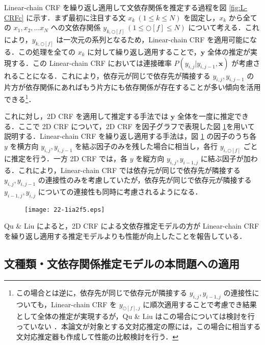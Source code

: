 \documentclass[japanese]{jnlp_1.4}
\begin{document}
Linear-chain CRF を繰り返し適用して文依存関係を推定する過程を図 \ref{fig:L-CRFc} に示す．まず最初に注目する文 $x_k ~ (1 \leq k \leq N)$ を固定し，$x_k$ から全ての $x_1, x_2, \dots x_N$ への文依存関係 $y_{k,\Circle[f]} ~ (1 \leq \Circle[f] \leq N)$ について考える．これにより，$y_{k,\Circle[f]}$ は一次元の系列となるため，Linear-chain CRF を適用可能になる．この処理を全ての $x_k$ に対して繰り返し適用することで，$\bm{y}$ 全体の推定が実現する．この Linear-chain CRF においては連接確率 $P(y_{i,j}|y_{i,j-1},\bm{x})$ が考慮されることになる．これにより，依存元が同じで依存先が隣接する $y_{i,j}, y_{i,j-1}$ の片方が依存関係にあればもう片方にも依存関係が存在することが多い傾向を活用できる\footnote{この場合とは逆に，依存先が同じで依存元が隣接する $y_{i,j}, y_{i-1,j}$ の連接性についても，Linear-chain CRF を $y_{\Circle[f],j}$ に順次適用することで考慮でき結果として全体の推定が実現するが，Qu \& Liu はこの場合については検討を行っていない \cite{Zhonghua2012}．本論文が対象とする文対応推定の際には，この場合に相当する文対応推定器も作成して性能の比較検討を行う．}．

これに対し，2D CRF を適用して推定する手法では $\bm{y}$ 全体を一度に推定できる．ここで 2D CRF について，2D CRF を因子グラフで表現した図 \ref{fig:2D-CRFc}を用いて説明する．Linear-chain CRF を繰り返し適用する手法は，図 \ref{fig:2D-CRFc} の因子のうち各 $y$ を横方向 $y_{i,j}, y_{i,j-1}$ を結ぶ因子のみを残した場合に相当し，各行 $y_{i,\Circle[f]}$ ごとに推定を行う．一方 2D CRF では，各 $y$ を縦方向 $y_{i,j}, y_{i-1,j}$ に結ぶ因子が加わる．これにより，Linear-chain CRF では依存元が同じで依存先が隣接する $y_{i,j}, y_{i,j-1}$ の連接性のみを考慮していたが，依存先が同じで依存元が隣接する $y_{i-1,j}, y_{i,j}$ についての連接性も同時に考慮されるようになる．

\begin{figure}[t]
\begin{center}
\texttt{[image: 22-1ia2f5.eps]}
\end{center}
\label{fig:2D-CRFc}
\end{figure}

Qu \& Liu によると，2D CRF による文依存推定モデルの方が Linear-chain CRF を繰り返し適用する推定モデルよりも性能が向上したことを報告している．


\subsection{文種類・文依存関係推定モデルの本問題への適用} \label{sec:proposal-simple}
\end{document}
